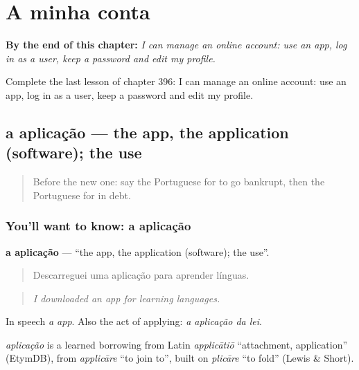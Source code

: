 
\chapter{A minha conta}
\label{ch:pt-a-minha-conta}

\begin{chapteropening}
\textbf{By the end of this chapter:} \emph{I can manage an online account: use an app, log in as a user, keep a password and edit my profile.}

Complete the last lesson of chapter 396: I can manage an online account: use an app, log in as a user, keep a password and edit my profile.
\end{chapteropening}

\section[a aplicação]{a aplicação — the app, the application (software); the use}

\label{lesson:PT-C396-aplicacao}



\begin{quote}
Before the new one: say the Portuguese for to go bankrupt, then the Portuguese for in debt.
\end{quote}

\subsection*{You'll want to know: a aplicação}
\textbf{a aplicação} — \textquotedblleft{}the app, the application (software); the use\textquotedblright{}.

\begin{quote}
Descarreguei uma aplicação para aprender línguas.
\end{quote}

\begin{quote}
\emph{I downloaded an app for learning languages.}
\end{quote}

In speech \emph{a app}. Also the act of applying: \emph{a aplicação da lei}.

\begin{cousinweb}
\emph{aplicação} is a learned borrowing from Latin \emph{applicātiō} \textquotedblleft{}attachment, application\textquotedblright{} (EtymDB), from \emph{applicāre} \textquotedblleft{}to join to\textquotedblright{}, built on \emph{plicāre} \textquotedblleft{}to fold\textquotedblright{} (Lewis \& Short).
\end{cousinweb}

